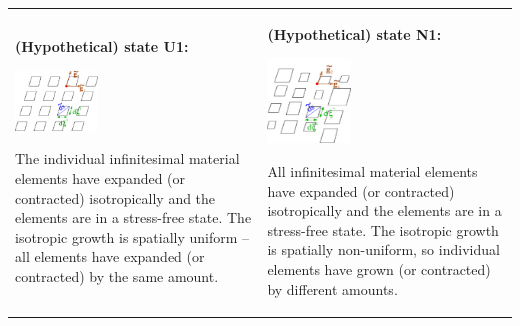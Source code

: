 \tabulinesep=1mm
\begin{longtabu} spread 0pt [c]{*{2}{|X[-1]}|}
\hline
\begin{center}{\bfseries (Hypothetical) state U1\+:}\end{center} 

 
\begin{DoxyImageNoCaption}
  \mbox{\includegraphics[width=0.35\textwidth]{Isotropic_growth_U1}}
\end{DoxyImageNoCaption}


The individual infinitesimal material elements have expanded (or contracted) isotropically and the elements are in a stress-\/free state. The isotropic growth is spatially uniform -- all elements have expanded (or contracted) by the same amount.  &\begin{center}{\bfseries (Hypothetical) state N1\+:}\end{center} 

 
\begin{DoxyImageNoCaption}
  \mbox{\includegraphics[width=0.35\textwidth]{Isotropic_growth_N1}}
\end{DoxyImageNoCaption}


All infinitesimal material elements have expanded (or contracted) isotropically and the elements are in a stress-\/free state. The isotropic growth is spatially non-\/uniform, so individual elements have grown (or contracted) by different amounts.   \\
\end{longtabu}


